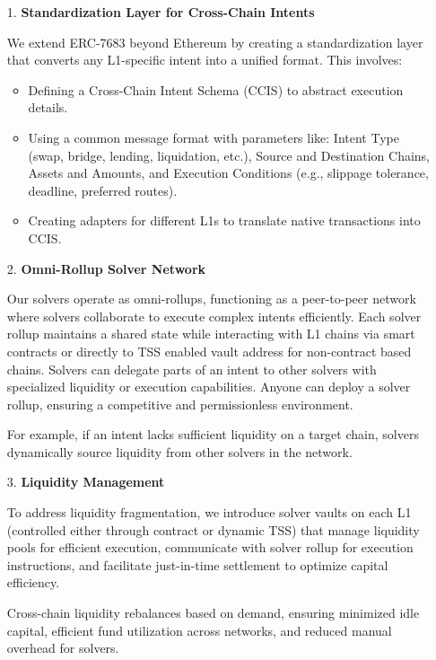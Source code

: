 \begin{itemize}
    \item[1.] \textbf{Standardization Layer for Cross-Chain Intents}

    We extend ERC-7683 beyond Ethereum by creating a standardization layer that converts any L1-specific intent into a unified format. This involves:
    \begin{itemize}
        \item Defining a Cross-Chain Intent Schema (CCIS) to abstract execution details.
        \item Using a common message format with parameters like: Intent Type (swap, bridge, lending, liquidation, etc.), Source  and Destination Chains, Assets and Amounts, and Execution Conditions (e.g., slippage tolerance, deadline, preferred routes).
        \item Creating adapters for different L1s to translate native transactions into CCIS.
    \end{itemize}

    \item[2.] \textbf{Omni-Rollup Solver Network}

    Our solvers operate as omni-rollups, functioning as a peer-to-peer network where solvers collaborate to execute complex intents efficiently. Each solver rollup maintains a shared state while interacting with L1 chains via smart contracts or directly to TSS enabled vault address for non-contract based chains.
    Solvers can delegate parts of an intent to other solvers with specialized liquidity or execution capabilities. Anyone can deploy a solver rollup, ensuring a competitive and permissionless environment.

    For example, if an intent lacks sufficient liquidity on a target chain, solvers dynamically source liquidity from other solvers in the network.

    \item[3.] \textbf{Liquidity Management}

    To address liquidity fragmentation, we introduce solver vaults on each L1 (controlled either through contract or dynamic TSS) that manage liquidity pools for efficient execution, communicate with solver rollup for execution instructions, and facilitate just-in-time settlement to optimize capital efficiency.

    Cross-chain liquidity rebalances based on demand, ensuring minimized idle capital, efficient fund utilization across networks, and reduced manual overhead for solvers.


\end{itemize}
